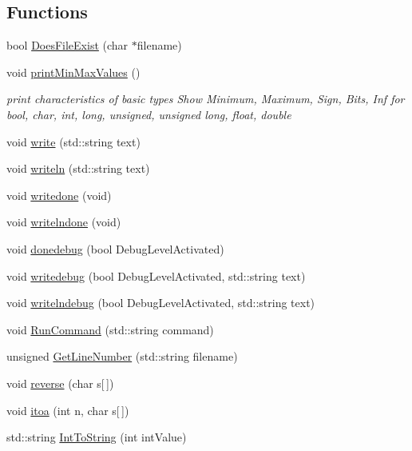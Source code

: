 \subsection*{Functions}
\begin{DoxyCompactItemize}
\item 
bool \hyperlink{Global_8cpp_a1c4c7d9ff8a31be4d5076c817d1297e3}{DoesFileExist} (char $\ast$filename)
\item 
void \hyperlink{Global_8cpp_a1b824bf818f237a2290ee0dcb9a4d1d6}{printMinMaxValues} ()
\begin{DoxyCompactList}\small\item\em print characteristics of basic types Show Minimum, Maximum, Sign, Bits, Inf for bool, char, int, long, unsigned, unsigned long, float, double \item\end{DoxyCompactList}\item 
void \hyperlink{Global_8cpp_aadd6ff8eac457116cc843c4b98bc0636}{write} (std::string text)
\item 
void \hyperlink{Global_8cpp_a37de7b6ae4852c4084f30507d58eb906}{writeln} (std::string text)
\item 
void \hyperlink{Global_8cpp_a90a26977d0e79592478299043e94091e}{writedone} (void)
\item 
void \hyperlink{Global_8cpp_a6ea51689681a48365e4852a63687b8e6}{writelndone} (void)
\item 
void \hyperlink{Global_8cpp_a537260c4c4c2057809ee9ca92cf460c7}{donedebug} (bool DebugLevelActivated)
\item 
void \hyperlink{Global_8cpp_a865c3c98145e9535ae7575ff0161119d}{writedebug} (bool DebugLevelActivated, std::string text)
\item 
void \hyperlink{Global_8cpp_a5b25522225f9cc3d16b32059a125a93e}{writelndebug} (bool DebugLevelActivated, std::string text)
\item 
void \hyperlink{Global_8cpp_af14ce9adc079d3106f6fe5ed977660a9}{RunCommand} (std::string command)
\item 
unsigned \hyperlink{Global_8cpp_a5cf7528ff238e0f7be1d86289650f04e}{GetLineNumber} (std::string filename)
\item 
void \hyperlink{Global_8cpp_aa8a9a8836962d890b4939c112fd29190}{reverse} (char s\mbox{[}$\,$\mbox{]})
\item 
void \hyperlink{Global_8cpp_af749add1ff19b6ff96a62f35ebb49b7e}{itoa} (int n, char s\mbox{[}$\,$\mbox{]})
\item 
std::string \hyperlink{Global_8cpp_a3d2b4d4a9d8d164a3fdea80bfc1ea93d}{IntToString} (int intValue)

\end{DoxyCompactItemize}
